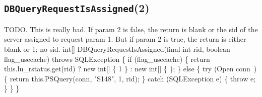 \subsection{\texttt{DBQueryRequestIsAssigned}(2)}
TODO. This is really bad. If param 2 is false, the return is blank or the sid
of the server assigned to request param 1. But if param 2 is true, the return
is either blank or 1; no sid.
\nwenddocs{}\endmoddef{}
int[] DBQueryRequestIsAssigned(final int rid, boolean flag_usecache) throws SQLException \{
  if (flag_usecache) \{
    return this.lu_rstatus.get(rid) ? new int[] \{ 1 \} : new int[] \{ \};
  \} else \{
    try (\LA{}Open \code{}conn\edoc{}~{\nwtagstyle{}}\RA{}) \{
      return this.PSQuery(conn, "S148", 1, rid);
    \} catch (SQLException e) \{
      throw e;
    \}
  \}
\}
\eatline
{}\nwendcode{}\nwdocspar
